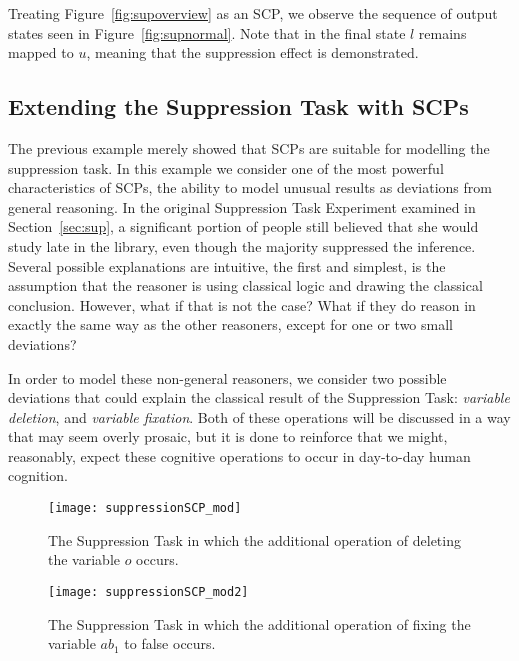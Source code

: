 Treating Figure~\ref{fig:supoverview} as an SCP, we observe the sequence of output states seen in Figure~\ref{fig:supnormal}. Note that in the final state $l$ remains mapped to $u$, meaning that the suppression effect is demonstrated.

\subsection{Extending the Suppression Task with SCPs}
The previous example merely showed that SCPs are suitable for modelling the suppression task. In this example we consider one of the most powerful characteristics of SCPs, the ability to model unusual results as deviations from general reasoning. In the original Suppression Task Experiment examined in Section~\ref{sec:sup}, a significant portion of people still believed that she would study late in the library, even though the majority suppressed the inference. Several possible explanations are intuitive, the first and simplest, is the assumption that the reasoner is using classical logic and drawing the classical conclusion. However, what if that is not the case? What if they do reason in exactly the same way as the other reasoners, except for one or two small deviations?

In order to model these non-general reasoners, we consider two possible deviations that could explain the classical result of the Suppression Task: \textit{variable deletion}, and\textit{ variable fixation}. Both of these operations will be discussed in a way that may seem overly prosaic, but it is done to reinforce that we might, reasonably, expect these cognitive operations to occur in day-to-day human cognition.


\begin{figure*}
\begin{center}
\texttt{[image: suppressionSCP\_mod]}
\end{center}

\caption{The Suppression Task in which the additional operation of deleting the variable $o$ occurs.}
\label{fig:supmod}
\end{figure*}

\begin{figure*}
\begin{center}
\texttt{[image: suppressionSCP\_mod2]}
\end{center}

\caption{The Suppression Task in which the additional operation of fixing the variable $ab_1$ to false occurs.}
\label{fig:supmod2}
\end{figure*}
